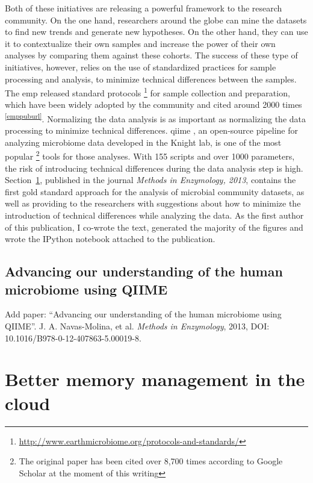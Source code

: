 \documentclass[12pt,chapterheads]{ucsd}
\begin{document}
Both of these initiatives are releasing a powerful framework to the research
community. On the one hand, researchers around the globe can mine the datasets to
find new trends and generate new hypotheses. On the other hand, they can use
it to contextualize their own samples and increase the power of their own analyses
by comparing them against these cohorts. The success of these type of initiatives,
however, relies on the use of standardized practices for sample processing and
analysis, to minimize technical differences between the samples. The \gls{emp}
released standard protocols \footnote{ \url{http://www.earthmicrobiome.org/protocols-and-standards/}}
for sample collection and preparation, which have been widely adopted by the community and cited
around 2000 times \textsuperscript{\ref{emppuburl}}. Normalizing the data
analysis is as important as normalizing the data processing to minimize
technical differences. %
\gls{qiime} \cite{Caporaso2010}, an open-source pipeline for analyzing microbiome
data developed in the Knight lab, is one of the most popular \footnote{The original paper
has been cited over 8,700 times according to Google Scholar at the moment of this writing}
tools for those analyses. With 155 scripts and over 1000
parameters, the risk of introducing technical differences during the data analysis
step is high. Section~\ref{section_book}, published in the journal
\textsl{Methods in Enzymology, 2013}, contains the first gold standard approach
for the analysis of microbial community datasets, as well as providing to the
researchers with suggestions about how to minimize the introduction of
technical differences while analyzing the data. As the first author of this
publication, I co-wrote the text, generated the majority of the figures and wrote
the IPython notebook \cite{Perez2007} attached to the publication.


% 
\section{Advancing our understanding of the human microbiome using QIIME}\label{section_book}
Add paper: ``Advancing our understanding of the human microbiome using QIIME''. J. A. Navas-Molina, et al. \emph{Methods in Enzymology}, 2013, DOI: 10.1016/B978-0-12-407863-5.00019-8.




\chapter{Better memory management in the cloud}\label{chapter_cudswap}
\glsresetall
\end{document}
